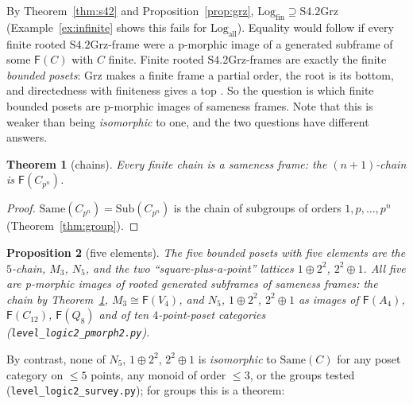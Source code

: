 \documentclass[11pt]{amsart}
\newtheorem{thm}{Theorem}[section]
\newtheorem{prop}[thm]{Proposition}
\theoremstyle{definition}
\newcommand{\Same}{\mathrm{Same}}
\newcommand{\Sub}{\mathrm{Sub}}
\newcommand{\Log}{\mathrm{Log}}
\newcommand{\Fr}{\mathsf{F}}
\newcommand{\Grz}{\mathrm{Grz}}
\begin{document}
By Theorem~\ref{thm:s42} and Proposition~\ref{prop:grz},
$\Log_{\mathrm{fin}}\supseteq\mathrm{S4.2Grz}$ (Example~\ref{ex:infinite}
shows this fails for $\Log_{\mathrm{all}}$). Equality would follow if every
finite rooted $\mathrm{S4.2Grz}$-frame were a p-morphic image of a generated
subframe of some $\Fr(C)$ with $C$ finite. Finite rooted $\mathrm{S4.2Grz}$-frames are exactly the finite
\emph{bounded posets}: $\Grz$ makes a finite frame a partial order, the root is
its bottom, and directedness with finiteness gives a top \cite{CZ97}. So the
question is which finite bounded posets are p-morphic images of sameness
frames. Note that this is weaker than being \emph{isomorphic} to one, and the
two questions have different answers.

\begin{thm}[chains]\label{thm:chains}
Every finite chain is a sameness frame: the $(n{+}1)$-chain is $\Fr(C_{p^n})$.
\end{thm}
\begin{proof}
$\Same(C_{p^n})=\Sub(C_{p^n})$ is the chain of subgroups of orders
$1,p,\dots,p^n$ (Theorem~\ref{thm:group}).
\end{proof}

\begin{prop}[five elements]\label{prop:five}
The five bounded posets with five elements are the $5$-chain, $M_3$, $N_5$, and
the two ``square-plus-a-point'' lattices $1\oplus2^2$, $2^2\oplus1$. All five are
p-morphic images of rooted generated subframes of sameness frames: the chain by
Theorem~\ref{thm:chains}, $M_3\cong\Fr(V_4)$, and $N_5$, $1\oplus2^2$,
$2^2\oplus1$ as images of $\Fr(A_4)$, $\Fr(C_{12})$, $\Fr(Q_8)$ and of ten
$4$-point-poset categories (\texttt{level\_logic2\_pmorph2.py}).
\end{prop}

By contrast, none of $N_5$, $1\oplus2^2$, $2^2\oplus1$ is \emph{isomorphic} to
$\Same(C)$ for any poset category on $\le5$ points, any monoid of order $\le3$,
or the groups tested (\texttt{level\_logic2\_survey.py}); for groups this is a
theorem:
\end{document}

